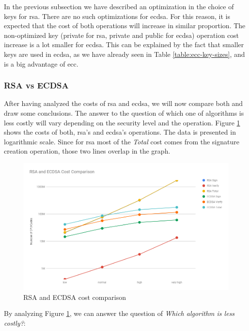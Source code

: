 \documentclass{llncs}
\begin{document}
In the previous subsection we have described an optimization in the choice of keys for \gls{rsa}. There are no such optimizations
for \gls{ecdsa}. For this reason, it is expected that the cost of both operations will increase in similar proportion. The non-optimized
key (private for \gls{rsa}, private and public for \gls{ecdsa}) operation cost increase is a lot smaller for \gls{ecdsa}. This can be
explained by the fact that smaller keys are used in \gls{ecdsa}, as we have already seen in Table \ref{table:ecc-key-sizes},
and is a big advantage of \gls{ecc}.

\subsubsection{RSA vs ECDSA} \label{sec:rsa-vs-ecdsa}

After having analyzed the costs of \gls{rsa} and \gls{ecdsa}, we will now compare both and draw some conclusions. The answer to the
question of which one of algorithms is less costly will vary depending on the security level and the operation. Figure \ref{fig:ecdsa-rsa-costs-all}
shows the costs of both, \gls{rsa}'s and \gls{ecdsa}'s operations. The data is presented in logarithmic scale. Since for \gls{rsa} most
of the \textit{Total} cost comes from the signature creation operation, those two lines overlap in the graph.

\begin{figure}
  \centering
  \includegraphics[width=1.0\textwidth]{img/rsa_ecdsa_costs_all.png}
  \centering \caption{\label{fig:ecdsa-rsa-costs-all} RSA and ECDSA cost comparison}
\end{figure}

By analyzing Figure \ref{fig:ecdsa-rsa-costs-all}, we can answer the question of \textit{Which algorithm is less costly?}:
\end{document}

